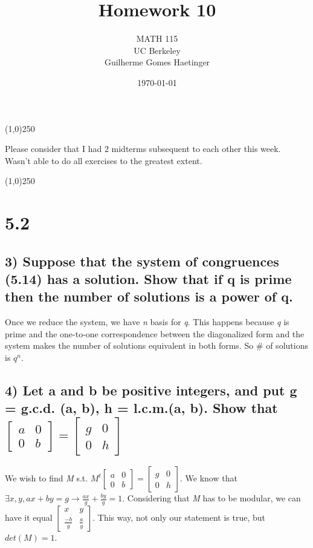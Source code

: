 \documentclass[11pt]{article}
\author{MATH 115 \\ UC Berkeley \\ Guilherme Gomes Haetinger}
\date{\today}
\title{Homework 10}
\begin{document}
\maketitle
\begin{center}
\line(1,0){250}
\end{center}

Please consider that I had 2 midterms subsequent to each other this week. Wasn't able to do all exercises to the greatest extent.

\begin{center}
\line(1,0){250}
\end{center}

\section*{5.2}
\label{sec:org9246eae}

\subsection*{3) Suppose that the system of congruences (5.14) has a solution. Show that if q is prime then the number of solutions is a power of q.}
\label{sec:org3d0145d}

Once we reduce the system, we have \emph{n} basis for \emph{q}. This happens because \emph{q} is prime and the one-to-one correspondence between the diagonalized form and the system makes the number of solutions equivalent in both forms. So \# of solutions is \(q^n\).

\subsection*{4) Let a and b be positive integers, and put g = g.c.d. (a, b), h = l.c.m.(a, b). Show that \(\begin{bmatrix}a & 0 \\ 0 & b\end{bmatrix} = \begin{bmatrix}g & 0 \\ 0 & h\end{bmatrix}\)}
\label{sec:org7f0c505}

We wish to find \emph{M} s.t. \(M^t\begin{bmatrix}a & 0 \\ 0 & b\end{bmatrix} = \begin{bmatrix}g & 0 \\ 0 & h \end{bmatrix}\). We know that \(\exists x,y, ax + by = g \to \frac{ax}{g} + \frac{by}{g} = 1\). Considering that \emph{M} has to be modular, we can have it equal \(\begin{bmatrix}x & y \\ \frac{-b}{g} & \frac{a}{g}\end{bmatrix}\). This way, not only our statement is true, but \(det(M) = 1\).
\end{document}
